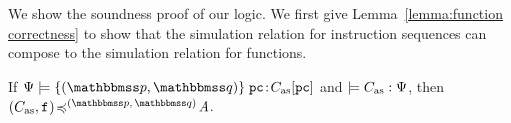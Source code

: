 We show the soundness proof of our logic.
We first give Lemma~\ref{lemma:function correctness}
to show that the simulation relation for instruction
sequences can compose to the simulation relation for
functions.
\begin{lemma}
    \label{lemma:function correctness}
    If {\em $\semwffseqrel{\Cspec{}}{\relastP}{\relastQ}
                {\pc}{\asmimp[\pc]}$} and
    {\em $\models C_{\text{as}}:\Psi{}$}, then
    {\em $\simFunction{(\asmimp, \lab{})}
            {(\relastP, \, \relastQ)}{\primcom}$}.
\end{lemma}



